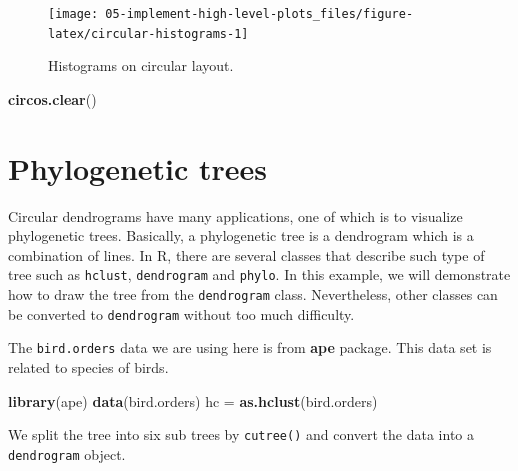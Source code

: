 \documentclass[]{book}
\newenvironment{Shaded}{\begin{snugshade}}{\end{snugshade}}
\newcommand{\KeywordTok}[1]{\textcolor[rgb]{0.13,0.29,0.53}{\textbf{#1}}}
\newcommand{\DecValTok}[1]{\textcolor[rgb]{0.00,0.00,0.81}{#1}}
\newcommand{\StringTok}[1]{\textcolor[rgb]{0.31,0.60,0.02}{#1}}
\newcommand{\CommentTok}[1]{\textcolor[rgb]{0.56,0.35,0.01}{\textit{#1}}}
\newcommand{\OperatorTok}[1]{\textcolor[rgb]{0.81,0.36,0.00}{\textbf{#1}}}
\newcommand{\NormalTok}[1]{#1}
\begin{document}
\begin{figure}

{\centering \texttt{[image: 05-implement-high-level-plots\_files/figure-latex/circular-histograms-1]} 

}

\caption{Histograms on circular layout.}\label{fig:circular-histograms}
\end{figure}

\begin{Shaded}
\begin{Highlighting}[]
\KeywordTok{circos.clear}\NormalTok{()}
\end{Highlighting}
\end{Shaded}

\section{Phylogenetic trees}\label{phylogenetic-trees}

Circular dendrograms have many applications, one of which is to
visualize phylogenetic trees. Basically, a phylogenetic tree is a
dendrogram which is a combination of lines. In R, there are several
classes that describe such type of tree such as \texttt{hclust},
\texttt{dendrogram} and \texttt{phylo}. In this example, we will
demonstrate how to draw the tree from the \texttt{dendrogram} class.
Nevertheless, other classes can be converted to \texttt{dendrogram}
without too much difficulty.

The \texttt{bird.orders} data we are using here is from \textbf{ape}
package. This data set is related to species of birds.

\begin{Shaded}
\begin{Highlighting}[]
\KeywordTok{library}\NormalTok{(ape)}
\KeywordTok{data}\NormalTok{(bird.orders)}
\NormalTok{hc =}\StringTok{ }\KeywordTok{as.hclust}\NormalTok{(bird.orders)}
\end{Highlighting}
\end{Shaded}

We split the tree into six sub trees by \texttt{cutree()} and convert
the data into a \texttt{dendrogram} object.

\begin{Shaded}
\end{Shaded}
\end{document}
